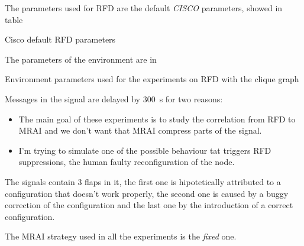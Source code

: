 The parameters used for \ac{RFD} are the default \textit{CISCO} parameters,
showed in table 

\begin{table}[h]
	
	\caption{Cisco default \ac{RFD} parameters}
	\label{tbl:cisco_rfd}
\end{table}

The parameters of the environment are in 

\begin{table}[h]
	
	\caption{Environment parameters used for the experiments on \ac{RFD}
		with the clique graph}
	\label{tbl:clique_rfd_params}
\end{table}

Messages in the signal are delayed by \SI{300}{\second} for two reasons:
\begin{itemize}
	\item The main goal of these experiments is to study the correlation from
		\ac{RFD} to \ac{MRAI} and we don't want that \ac{MRAI} compress
		parts of the signal.
	\item I'm trying to simulate one of the possible behaviour tat triggers
		\ac{RFD} suppressions, the human faulty reconfiguration of the node.
\end{itemize}

The signals contain \num{3} flaps in it, the first one is hipotetically attributed
to a configuration that doesn't work properly, the second one is caused by a
buggy correction of the configuration and the last one by the introduction of a
correct configuration.

The \ac{MRAI} strategy used in all the experiments is the \textit{fixed} one.

